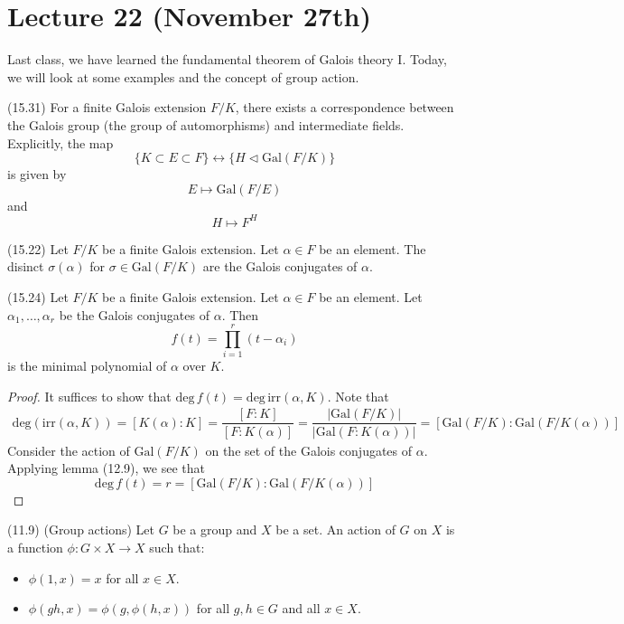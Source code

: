 \section{Lecture 22 (November 27th)}
\begin{rmk}
Last class, we have learned the fundamental theorem of Galois theory I. Today, we will look at some examples and the concept of group action.
\end{rmk}
\vspace{2ex}
\begin{thm}
(15.31) For a finite Galois extension $F/K$, there exists a correspondence between the Galois group (the group of automorphisms) and intermediate fields. Explicitly, the map
\[\{K\subset E\subset F\}\leftrightarrow \{H\triangleleft \mathrm{Gal}(F/K)\}\]
is given by
\[E\mapsto \mathrm{Gal}(F/E)\]
and
\[H\mapsto F^{H}\]
\end{thm}
\vspace{2ex}
\begin{defi}
(15.22) Let $F/K$ be a finite Galois extension. Let $\alpha \in F$ be an element. The disinct $\sigma (\alpha )$ for $\sigma \in \mathrm{Gal}(F/K)$ are the Galois conjugates of $\alpha $. 
\end{defi}
\vspace{2ex}
\begin{prop}
(15.24) Let $F/K$ be a finite Galois extension. Let $\alpha \in F$ be an element. Let $\alpha_1,\ldots ,\alpha _{r}$ be the Galois conjugates of $\alpha $. Then
\[f(t)=\prod^{r}_{i=1}(t-\alpha _{i})\]
is the minimal polynomial of $\alpha $ over $K$.
\end{prop}
\vspace{2ex}
\begin{proof}
It suffices to show that $\mathrm{deg}\,f(t)=\mathrm{deg}\,\mathrm{irr}(\alpha ,K)$. Note that 
\[\begin{align*}
\mathrm{deg}(\mathrm{irr}(\alpha ,K))=[K(\alpha ):K]=\dfrac{[F:K]}{[F:K(\alpha )]}=\dfrac{|\mathrm{Gal}(F/K)|}{|\mathrm{Gal}(F:K(\alpha ))|}=[\mathrm{Gal}(F/K):\mathrm{Gal}(F/K(\alpha ))]
\end{align*}\]
Consider the action of $\mathrm{Gal}(F/K)$ on the set of the Galois conjugates of $\alpha $. Applying lemma (12.9), we see that
\[\mathrm{deg}\,f(t)=r=[\mathrm{Gal}(F/K):\mathrm{Gal}(F/K(\alpha ))]\]
\end{proof}
\vspace{2ex}
\begin{defi}
(11.9) (Group actions) Let $G$ be a group and $X$ be a set. An action of $G$ on $X$ is a function $\phi :G\times X\rightarrow X$ such that:
\begin{itemize}
\item[(i)] $\phi (1,x)=x$ for all $x\in X$.
\item[(ii)] $\phi (gh,x)=\phi (g,\phi (h,x))$ for all $g,h\in G$ and all $x\in X$.
\end{itemize}
\end{defi}
